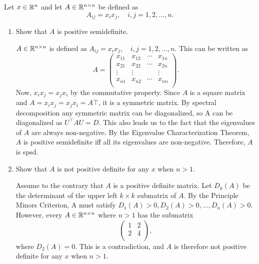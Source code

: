 \documentclass{article}
\begin{document}
	\begin{ex}
		Let $x\in \mathbb{R}^n$ and let $A\in\mathbb{R}^{n\times n}$  be defined as
			\begin{equation*}
				A_{ij} = x_i x_j, \quad i,j=1,2,\ldots,n.
			\end{equation*}
		\begin{enumerate}
			\item Show that $A$ is positive semidefinite.
			    
			    \bigskip
			    
	            $A \in \mathbb{R}^{n \times n}$ is defined as $A_{ij} = x_i x_j, \quad i,j=1,2,\ldots,n.$ This can be written as 
			    \begin{equation*} A = 
			        \begin{pmatrix}
			            x_{11} & x_{12} & \cdots & x_{1n} \\
			            x_{21} & x_{22} & \cdots & x_{2n} \\
			            \vdots & \vdots & & \vdots \\
			            x_{n1} & x_{n2} & \cdots & x_{nn} \\
			        \end{pmatrix}.
			    \end{equation*}
			    Now, $x_i x_j = x_j x_i$ by the commutative property. Since $A$ is a square matrix and $A = x_i x_j = x_j x_i = A\top$, it is a symmetric matrix. By spectral decomposition any symmetric matrix can be diagonalized, so A can be diagonalized as $U^\top AU = D$. This also leads us to the fact that the eigenvalues of $A$ are always non-negative. By the Eigenvalue Characterization Theorem, $A$ is positive semidefinite iff all its eigenvalues are non-negative. Therefore, $A$ is spsd.
			
			\item Show that $A$ is not positive definite for any $x$ when $n>1$.
			
			    \bigskip
			
			    Assume to the contrary  that $A$ is a positive definite matrix. Let $D_k (A)$ be the determinant of the upper left $k \times k$ submatrix of $A$. By the Principle Minors Criterion, A must satisfy $D_1 (A) > 0, D_2 (A) > 0, ..., D_n (A) > 0$. However, every $A \in \mathbb{R}^{n \times n}$ where $n > 1$ has the submatrix 
			    \begin{equation*}
			        \left(
			        \begin{array}{rr}
			            1 & 2\\
			            2 & 4\\
			        \end{array}
			        \right),
			    \end{equation*}
			    where $D_2 (A) = 0.$ \Lightning This is a contradiction, and $A$ is therefore not positive definite for any $x$ when $n>1$.
		\end{enumerate}	
	\end{ex}
	
\end{document}
